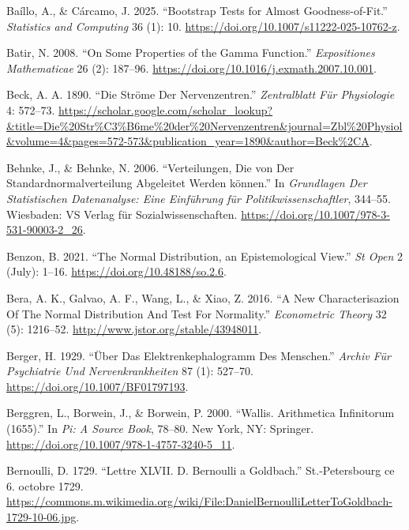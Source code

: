 \documentclass[
]{article}
\newlength{\cslhangindent}
\newlength{\cslentryspacingunit} %
\newenvironment{CSLReferences}[2] %
 {%
  \setlength{\parindent}{0pt}
  \ifodd #1
  \let\oldpar\par
  \def\par{\hangindent=\cslhangindent\oldpar}
  \fi
  \setlength{\parskip}{#2\cslentryspacingunit}
 }%
 {}
\begin{document}
\begin{CSLReferences}{1}{0}
\leavevmode{}%
Baíllo, A., \& Cárcamo, J. 2025. {``Bootstrap Tests for Almost
Goodness-of-Fit.''} \emph{Statistics and Computing} 36 (1): 10.
\url{https://doi.org/10.1007/s11222-025-10762-z}.

\leavevmode{}%
Batir, N. 2008. {``On Some Properties of the Gamma Function.''}
\emph{Expositiones Mathematicae} 26 (2): 187--96.
\url{https://doi.org/10.1016/j.exmath.2007.10.001}.

\leavevmode{}%
Beck, A. A. 1890. {``Die Ströme Der Nervenzentren.''} \emph{Zentralblatt
Für Physiologie} 4: 572--73.
\url{https://scholar.google.com/scholar_lookup?\&title=Die\%20Str\%C3\%B6me\%20der\%20Nervenzentren\&journal=Zbl\%20Physiol\&volume=4\&pages=572-573\&publication_year=1890\&author=Beck\%2CA}.

\leavevmode{}%
Behnke, J., \& Behnke, N. 2006. {``Verteilungen, Die von Der
Standardnormalverteilung Abgeleitet Werden k{ö}nnen.''} In
\emph{Grundlagen Der Statistischen Datenanalyse: Eine Einf{ü}hrung f{ü}r
Politikwissenschaftler}, 344--55. Wiesbaden: VS Verlag f{ü}r
Sozialwissenschaften.
\url{https://doi.org/10.1007/978-3-531-90003-2_26}.

\leavevmode{}%
Benzon, B. 2021. {``The Normal Distribution, an Epistemological View.''}
\emph{St Open} 2 (July): 1--16. \url{https://doi.org/10.48188/so.2.6}.

\leavevmode{}%
Bera, A. K., Galvao, A. F., Wang, L., \& Xiao, Z. 2016. {``{A New
Characterisazion Of The Normal Distribution And Test For Normality}.''}
\emph{Econometric Theory} 32 (5): 1216--52.
\url{http://www.jstor.org/stable/43948011}.

\leavevmode{}%
Berger, H. 1929. {``Über Das Elektrenkephalogramm Des Menschen.''}
\emph{Archiv Für Psychiatrie Und Nervenkrankheiten} 87 (1): 527--70.
\url{https://doi.org/10.1007/BF01797193}.

\leavevmode{}%
Berggren, L., Borwein, J., \& Borwein, P. 2000. {``Wallis. Arithmetica
Infinitorum (1655).''} In \emph{Pi: A Source Book}, 78--80. New York,
NY: Springer. \url{https://doi.org/10.1007/978-1-4757-3240-5_11}.

\leavevmode{}%
Bernoulli, D. 1729. {``{Lettre XLVII. D. Bernoulli a Goldbach}.''}
{St.-Petersbourg ce 6. octobre 1729}.
\url{https://commons.m.wikimedia.org/wiki/File:DanielBernoulliLetterToGoldbach-1729-10-06.jpg}.


\end{CSLReferences}
\end{document}
